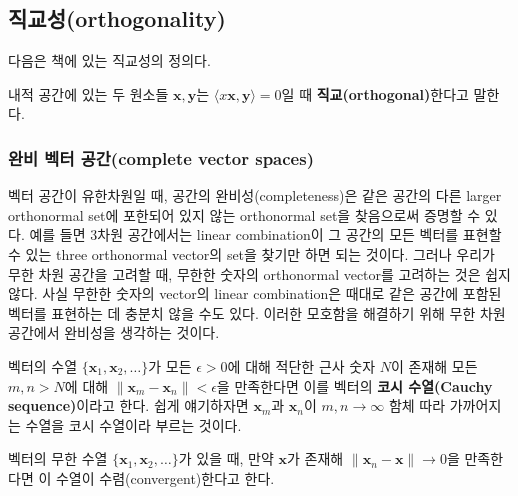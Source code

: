 \documentclass[b5paper,]{scrbook}
\theoremstyle{plain}
\theoremstyle{definition}
\numberwithin{equation}{section}
\let\BeginKnitrBlock\begin \let\EndKnitrBlock\end
\begin{document}
\hypertarget{orthogonality}{%
\subsection{직교성(orthogonality)}\label{orthogonality}}

다음은 \citep{Shima2016}책에 있는 직교성의 정의다.

\BeginKnitrBlock{definition}[직교]
\protect\hypertarget{def:unnamed-chunk-21}{}{\label{def:unnamed-chunk-21} {} }내적 공간에 있는 두 원소들 \(\mathbf{x}, \mathbf{y}\)는 \(\langle x\mathbf{x},\mathbf{y}\rangle = 0\)일 때 \textbf{직교(orthogonal)}한다고 말한다.
\EndKnitrBlock{definition}

\hypertarget{--complete-vector-spaces}{%
\subsubsection{완비 벡터 공간(complete vector spaces)}\label{--complete-vector-spaces}}

벡터 공간이 유한차원일 때, 공간의 완비성(completeness)은 같은 공간의 다른 larger orthonormal set에 포한되어 있지 않는 orthonormal set을 찾음으로써 증명할 수 있다. 예를 들면 3차원 공간에서는 linear combination이 그 공간의 모든 벡터를 표현할 수 있는 three orthonormal vector의 set을 찾기만 하면 되는 것이다. 그러나 우리가 무한 차원 공간을 고려할 때, 무한한 숫자의 orthonormal vector를 고려하는 것은 쉽지 않다. 사실 무한한 숫자의 vector의 linear combination은 때대로 같은 공간에 포함된 벡터를 표현하는 데 충분치 않을 수도 있다. 이러한 모호함을 해결하기 위해 무한 차원 공간에서 완비성을 생각하는 것이다.

\BeginKnitrBlock{definition}[벡터의 Cauchy sequence]
\protect\hypertarget{def:unnamed-chunk-22}{}{\label{def:unnamed-chunk-22} {} }벡터의 수열 \(\{ \mathbf{x}_{1},\mathbf{x}_{2},\ldots \}\)가 모든 \(\epsilon >0\)에 대해 적단한 근사 숫자 \(N\)이 존재해 모든 \(m,n > N\)에 대해 \(\| \mathbf{x}_{m} -\mathbf{x}_{n} \| < \epsilon\)을 만족한다면 이를 벡터의 \textbf{코시 수열(Cauchy sequence)}이라고 한다. 쉽게 얘기하자면 \(\mathbf{x}_{m}\)과 \(\mathbf{x}_{n}\)이 \(m,n \rightarrow \infty\) 함체 따라 가까어지는 수열을 코시 수열이라 부르는 것이다.
\EndKnitrBlock{definition}

\BeginKnitrBlock{definition}[코시 수열의 수렴]
\protect\hypertarget{def:unnamed-chunk-23}{}{\label{def:unnamed-chunk-23} {} }벡터의 무한 수열 \(\{\mathbf{x}_{1},\mathbf{x}_{2}, \ldots \}\)가 있을 때, 만약 \(\mathbf{x}\)가 존재해 \(\| \mathbf{x}_{n} -\mathbf{x}\|\rightarrow 0\)을 만족한다면 이 수열이 수렴(convergent)한다고 한다.
\EndKnitrBlock{definition}
\end{document}

